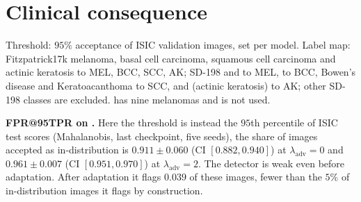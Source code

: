 \documentclass{midl}
\newcommand{\lam}{\lambda_{\mathrm{adv}}}
\begin{document}
\FloatBarrier
\section{Clinical consequence}
\label{app:clinical}

Threshold: $95\%$ acceptance of ISIC validation images, set per model. Label map:
Fitzpatrick17k melanoma, basal cell carcinoma, squamous cell carcinoma and actinic keratosis
to MEL, BCC, SCC, AK; SD-198 \texttt{} and \texttt{} to MEL,
\texttt{} to BCC, Bowen's disease and Keratoacanthoma to SCC, and
\texttt{} (actinic keratosis) to AK; other SD-198 classes are excluded.
\texttt{} has nine melanomas and is not used.

\textbf{FPR@95TPR on \texttt{}.} Here the threshold is instead the $95$th percentile of ISIC test
scores (Mahalanobis, last checkpoint, five seeds), the share of \texttt{} images accepted
as in-distribution is $0.911\pm0.060$ (CI $[0.882, 0.940]$) at $\lam=0$ and $0.961\pm0.007$
(CI $[0.951, 0.970]$) at $\lam=2$. The detector is weak even before adaptation. After
adaptation it flags $0.039$ of these images, fewer than the $5\%$ of in-distribution images it
flags by construction.
\end{document}
